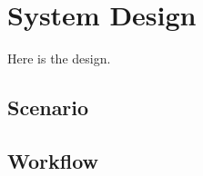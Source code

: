 \chapter{System Design}
\label{chapter:design}

Here is the design.

\section{Scenario}

\section{Workflow}